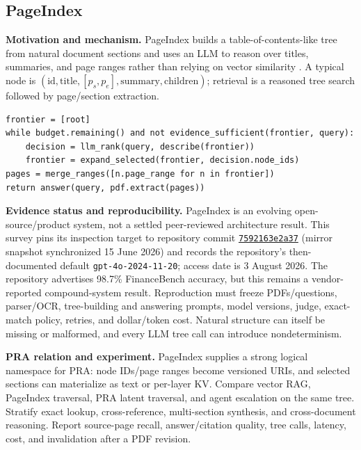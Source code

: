 \subsection{PageIndex}

\textbf{Motivation and mechanism.} PageIndex builds a table-of-contents-like tree from
natural document sections and uses an LLM to reason over titles, summaries, and page ranges
rather than relying on vector similarity \citep{pageindex2026}.  A typical node is
$(\mathrm{id},\mathrm{title},[p_s,p_e],\mathrm{summary},\mathrm{children})$; retrieval is a
reasoned tree search followed by page/section extraction.

\begin{lstlisting}[caption={Reasoning-first section traversal}]
frontier = [root]
while budget.remaining() and not evidence_sufficient(frontier, query):
    decision = llm_rank(query, describe(frontier))
    frontier = expand_selected(frontier, decision.node_ids)
pages = merge_ranges([n.page_range for n in frontier])
return answer(query, pdf.extract(pages))
\end{lstlisting}

\textbf{Evidence status and reproducibility.} PageIndex is an evolving open-source/product
system, not a settled peer-reviewed architecture result.  This survey pins its inspection
target to repository commit
\href{https://github.com/VectifyAI/PageIndex/commit/7592163e2a376b3917181fff9ac1858dc5daa2c6}{\texttt{7592163e2a37}}
(mirror snapshot synchronized 15 June 2026) and records the repository's then-documented
default \texttt{gpt-4o-2024-11-20}; access date is 3 August 2026.  The repository advertises
98.7\% FinanceBench accuracy, but this remains a vendor-reported compound-system result.
Reproduction must freeze PDFs/questions, parser/OCR, tree-building and answering prompts,
model versions, judge, exact-match policy, retries, and dollar/token cost.  Natural structure
can itself be missing or malformed, and every LLM tree call can introduce nondeterminism.

\textbf{PRA relation and experiment.} PageIndex supplies a strong logical namespace for
PRA: node IDs/page ranges become versioned URIs, and selected sections can materialize as
text or per-layer KV.  Compare vector RAG, PageIndex traversal, PRA latent traversal, and
agent escalation on the same tree.  Stratify exact lookup, cross-reference, multi-section
synthesis, and cross-document reasoning.  Report source-page recall, answer/citation quality,
tree calls, latency, cost, and invalidation after a PDF revision.

